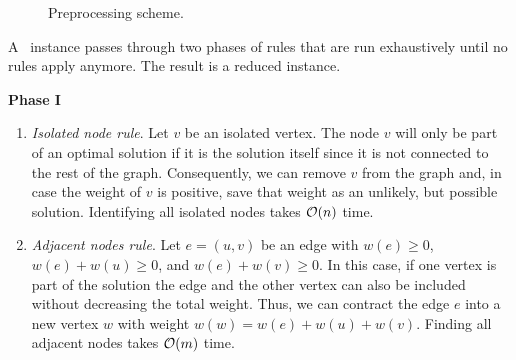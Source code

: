 \begin{figure}[H]
	\centering
	\caption{Preprocessing scheme.}
	\label{fig:preprocess:scheme}
\end{figure}

A \maxWSP\ instance passes through two phases of rules that are run exhaustively until no rules apply anymore. The result is a reduced instance.\medskip

\textbf{Phase I}
\begin{enumerate}
	\item \textit{Isolated node rule}. Let $v$ be an isolated vertex. The node $v$ will only be part of an optimal solution if it is the solution itself since it is not connected to the rest of the graph. Consequently, we can remove $v$ from the graph and, in case the weight of $v$ is positive, save that weight as an unlikely, but possible solution. Identifying all isolated nodes takes $\mathcal{O}(n)$ time.
	\item \textit{Adjacent nodes rule}. Let $e = (u,v)$ be an edge with $w(e) \geq 0$, $w(e) + w(u) \geq 0$, and $w(e) + w(v) \geq 0$. In this case, if one vertex is part of the solution  the edge and the other vertex can also be included without decreasing the total weight. Thus, we can contract the edge $e$ into a new vertex $w$ with weight $w(w) = w(e) + w(u) + w(v)$. Finding all adjacent nodes takes $\mathcal{O}(m)$ time.
\end{enumerate}

